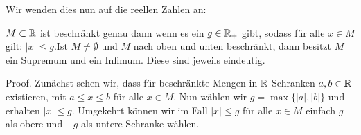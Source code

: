 Wir wenden dies nun auf die reellen Zahlen an:
\label{grundlagen/zahlensysteme:theorem-28}
\begin{theorem}{}{}



\(M \subset \mathbb{R}\) ist beschränkt genau dann wenn es ein \(g \in \mathbb{R}_+\) gibt, sodass für alle \(x \in M\) gilt: \(|x|\leq g\).Ist \(M \neq \emptyset\) und \(M\) nach oben und unten beschränkt, dann besitzt \(M\) ein Supremum und ein Infimum. Diese sind jeweils eindeutig.
\end{theorem}

\begin{emphBox}{}{}
Proof.  Zunächst sehen wir, dass für beschränkte Mengen in \(\mathbb{R}\) Schranken \(a,b \in \mathbb{R}\) existieren, mit \(a \leq x  \leq b\) für alle \(x \in M\). Nun wählen wir \(g=\max\{|a|,|b|\}\) und erhalten \(|x|\leq g\). Umgekehrt können wir im Fall \(|x|\leq g\) für alle \(x \in M\) einfach \(g\) als obere und \(-g\) als untere Schranke wählen.


\end{emphBox}
